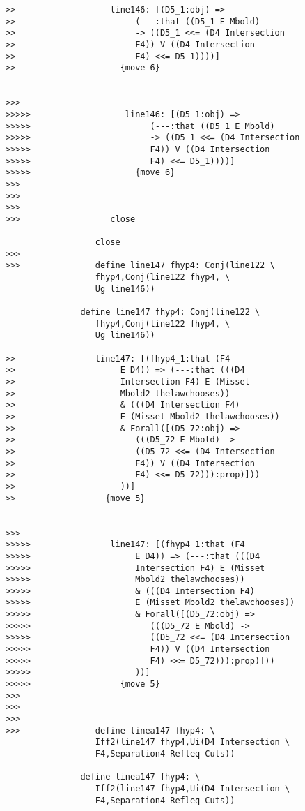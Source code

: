 \documentclass[12pt]{article}
\begin{document}
\begin{verbatim}
>>                   line146: [(D5_1:obj) =>
>>                        (---:that ((D5_1 E Mbold)
>>                        -> ((D5_1 <<= (D4 Intersection
>>                        F4)) V ((D4 Intersection
>>                        F4) <<= D5_1))))]
>>                     {move 6}


>>>
>>>>>                   line146: [(D5_1:obj) =>
>>>>>                        (---:that ((D5_1 E Mbold)
>>>>>                        -> ((D5_1 <<= (D4 Intersection
>>>>>                        F4)) V ((D4 Intersection
>>>>>                        F4) <<= D5_1))))]
>>>>>                     {move 6}
>>>
>>>
>>>
>>>                  close

                  close
>>>
>>>               define line147 fhyp4: Conj(line122 \
                  fhyp4,Conj(line122 fhyp4, \
                  Ug line146))

               define line147 fhyp4: Conj(line122 \
                  fhyp4,Conj(line122 fhyp4, \
                  Ug line146))

>>                line147: [(fhyp4_1:that (F4
>>                     E D4)) => (---:that (((D4
>>                     Intersection F4) E (Misset
>>                     Mbold2 thelawchooses))
>>                     & (((D4 Intersection F4)
>>                     E (Misset Mbold2 thelawchooses))
>>                     & Forall([(D5_72:obj) =>
>>                        (((D5_72 E Mbold) ->
>>                        ((D5_72 <<= (D4 Intersection
>>                        F4)) V ((D4 Intersection
>>                        F4) <<= D5_72))):prop)]))
>>                     ))]
>>                  {move 5}


>>>
>>>>>                line147: [(fhyp4_1:that (F4
>>>>>                     E D4)) => (---:that (((D4
>>>>>                     Intersection F4) E (Misset
>>>>>                     Mbold2 thelawchooses))
>>>>>                     & (((D4 Intersection F4)
>>>>>                     E (Misset Mbold2 thelawchooses))
>>>>>                     & Forall([(D5_72:obj) =>
>>>>>                        (((D5_72 E Mbold) ->
>>>>>                        ((D5_72 <<= (D4 Intersection
>>>>>                        F4)) V ((D4 Intersection
>>>>>                        F4) <<= D5_72))):prop)]))
>>>>>                     ))]
>>>>>                  {move 5}
>>>
>>>
>>>
>>>               define linea147 fhyp4: \
                  Iff2(line147 fhyp4,Ui(D4 Intersection \
                  F4,Separation4 Refleq Cuts))

               define linea147 fhyp4: \
                  Iff2(line147 fhyp4,Ui(D4 Intersection \
                  F4,Separation4 Refleq Cuts))



\end{verbatim}
\end{document}
